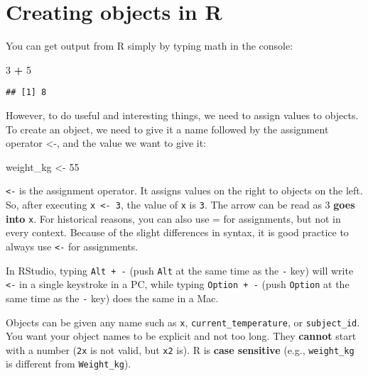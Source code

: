 \documentclass[]{book}
\newenvironment{Shaded}{\begin{snugshade}}{\end{snugshade}}
\newcommand{\DecValTok}[1]{\textcolor[rgb]{0.00,0.00,0.81}{#1}}
\newcommand{\NormalTok}[1]{#1}
\newcommand{\OperatorTok}[1]{\textcolor[rgb]{0.81,0.36,0.00}{\textbf{#1}}}
\newcommand{\StringTok}[1]{\textcolor[rgb]{0.31,0.60,0.02}{#1}}
\begin{document}
\hypertarget{creating-objects-in-r}{%
\section{Creating objects in R}\label{creating-objects-in-r}}

You can get output from R simply by typing math in the console:

\begin{Shaded}
\begin{Highlighting}[]
\DecValTok{3} \OperatorTok{+}\StringTok{ }\DecValTok{5}
\end{Highlighting}
\end{Shaded}

\begin{verbatim}
## [1] 8
\end{verbatim}

However, to do useful and interesting things, we need to assign values to objects. To create an object, we need to give it a name followed by the assignment operator \textless{}-, and the value we want to give it:

\begin{Shaded}
\begin{Highlighting}[]
\NormalTok{weight_kg <-}\StringTok{ }\DecValTok{55}
\end{Highlighting}
\end{Shaded}

\texttt{\textless{}-} is the assignment operator. It assigns values on the right to objects on the left. So, after executing \texttt{x\ \textless{}-\ 3}, the value of \texttt{x} is \texttt{3}. The arrow can be read as 3 \textbf{goes into} \texttt{x}. For historical reasons, you can also use = for assignments, but not in every context. Because of the slight differences in syntax, it is good practice to always use \texttt{\textless{}-} for assignments.

In RStudio, typing \texttt{Alt\ +\ -} (push \texttt{Alt} at the same time as the \texttt{-} key) will write \texttt{\textless{}-} in a single keystroke in a PC, while typing \texttt{Option\ +\ -} (push \texttt{Option} at the same time as the \texttt{-} key) does the same in a Mac.

Objects can be given any name such as \texttt{x}, \texttt{current\_temperature}, or \texttt{subject\_id}. You want your object names to be explicit and not too long. They \textbf{cannot} start with a number (\texttt{2x} is not valid, but \texttt{x2} is). R is \textbf{case sensitive} (e.g., \texttt{weight\_kg} is different from \texttt{Weight\_kg}).
\end{document}
